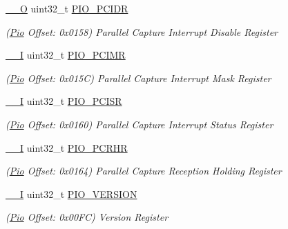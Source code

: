 \begin{DoxyCompactItemize}
\mbox{\label{structPio_a95fefc05f6e750b698e1d66d20cadf2c}} 
\mbox{\hyperlink{core__cm7_8h_a7e25d9380f9ef903923964322e71f2f6}{\+\_\+\+\_\+O}} uint32\+\_\+t \mbox{\hyperlink{structPio_a95fefc05f6e750b698e1d66d20cadf2c}{P\+I\+O\+\_\+\+P\+C\+I\+DR}}
\begin{DoxyCompactList}\small\item\em (\mbox{\hyperlink{structPio}{Pio}} Offset\+: 0x0158) Parallel Capture Interrupt Disable Register \end{DoxyCompactList}\item 
\mbox{\label{structPio_a7cd70c21de5488eefc2d5b41ed6d9c49}} 
\mbox{\hyperlink{core__cm7_8h_af63697ed9952cc71e1225efe205f6cd3}{\+\_\+\+\_\+I}} uint32\+\_\+t \mbox{\hyperlink{structPio_a7cd70c21de5488eefc2d5b41ed6d9c49}{P\+I\+O\+\_\+\+P\+C\+I\+MR}}
\begin{DoxyCompactList}\small\item\em (\mbox{\hyperlink{structPio}{Pio}} Offset\+: 0x015C) Parallel Capture Interrupt Mask Register \end{DoxyCompactList}\item 
\mbox{\label{structPio_a18b818b26780beb3a1adb278119b22e2}} 
\mbox{\hyperlink{core__cm7_8h_af63697ed9952cc71e1225efe205f6cd3}{\+\_\+\+\_\+I}} uint32\+\_\+t \mbox{\hyperlink{structPio_a18b818b26780beb3a1adb278119b22e2}{P\+I\+O\+\_\+\+P\+C\+I\+SR}}
\begin{DoxyCompactList}\small\item\em (\mbox{\hyperlink{structPio}{Pio}} Offset\+: 0x0160) Parallel Capture Interrupt Status Register \end{DoxyCompactList}\item 
\mbox{\label{structPio_a75b9bbb42bbaa2becb81de86899925c6}} 
\mbox{\hyperlink{core__cm7_8h_af63697ed9952cc71e1225efe205f6cd3}{\+\_\+\+\_\+I}} uint32\+\_\+t \mbox{\hyperlink{structPio_a75b9bbb42bbaa2becb81de86899925c6}{P\+I\+O\+\_\+\+P\+C\+R\+HR}}
\begin{DoxyCompactList}\small\item\em (\mbox{\hyperlink{structPio}{Pio}} Offset\+: 0x0164) Parallel Capture Reception Holding Register \end{DoxyCompactList}\item 
\mbox{\label{structPio_a387debe5d4e259d571ecacb9a39bcbf5}} 
\mbox{\hyperlink{core__cm7_8h_af63697ed9952cc71e1225efe205f6cd3}{\+\_\+\+\_\+I}} uint32\+\_\+t \mbox{\hyperlink{structPio_a387debe5d4e259d571ecacb9a39bcbf5}{P\+I\+O\+\_\+\+V\+E\+R\+S\+I\+ON}}
\begin{DoxyCompactList}\small\item\em (\mbox{\hyperlink{structPio}{Pio}} Offset\+: 0x00\+FC) Version Register \end{DoxyCompactList}\end{DoxyCompactItemize}


